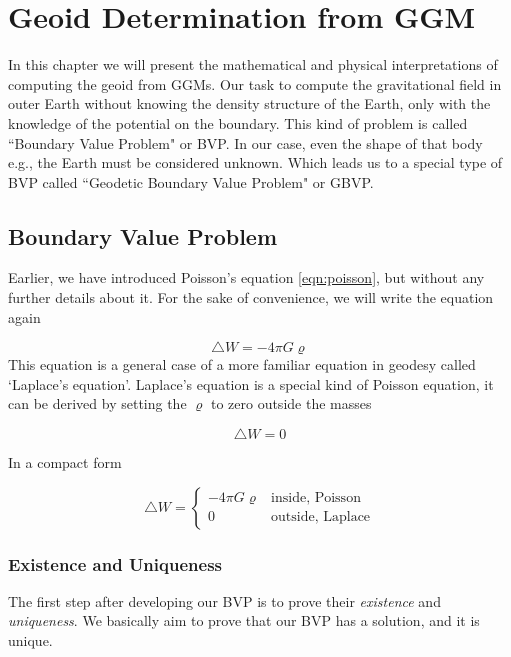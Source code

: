 \chapter{Geoid Determination from GGM}
\label{Chapter2}

In this chapter we will present the mathematical and physical interpretations of computing the geoid from GGMs. Our task to compute the gravitational field in outer Earth without knowing the density structure of the Earth, only with the knowledge of the potential on the boundary. This kind of problem is called ``Boundary Value Problem" or BVP. In our case, even the shape of that body e.g., the Earth must be considered unknown. Which leads us to a special type of BVP called ``Geodetic Boundary Value Problem" or GBVP.

\section{Boundary Value Problem}

Earlier, we have introduced Poisson's equation \ref{eqn:poisson}, but without any further details about it. For the sake of convenience, we will write the equation again

\begin{equation*}
\triangle W = -4 \pi G \varrho
\end{equation*} 
This equation is a general case of a more familiar equation in geodesy called `Laplace's equation'. Laplace's equation is a special kind of Poisson equation, it can be derived by setting the $\varrho$ to zero outside the masses

\begin{equation}
\label{eqn:laplace}
\triangle W = 0
\end{equation}

In a compact form 

\begin{equation}
\triangle W = 
\begin{cases}
-4 \pi G \varrho & \text{inside, Poisson} \\
0 & \text{outside, Laplace}
\end{cases}
\end{equation}




\subsection{Existence and Uniqueness}

The first step after developing our BVP is to prove their \textit{existence} and \textit{uniqueness}. We basically aim to prove that our BVP has a solution, and it is unique.

